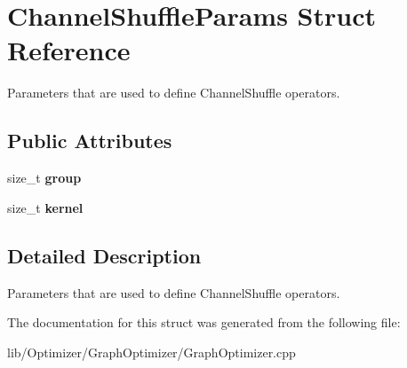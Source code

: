 \hypertarget{struct_channel_shuffle_params}{}\section{Channel\+Shuffle\+Params Struct Reference}
\label{struct_channel_shuffle_params}


Parameters that are used to define Channel\+Shuffle operators.  


\subsection*{Public Attributes}
\begin{DoxyCompactItemize}
\item 
\mbox{\label{struct_channel_shuffle_params_afd4c9ea7cb61d5cefaf8bf1bc5acb536}} 
size\+\_\+t {\bfseries group}
\item 
\mbox{\label{struct_channel_shuffle_params_a571560bc6c14ce29ff4e4d685b30e57e}} 
size\+\_\+t {\bfseries kernel}
\end{DoxyCompactItemize}


\subsection{Detailed Description}
Parameters that are used to define Channel\+Shuffle operators. 

The documentation for this struct was generated from the following file\+:\begin{DoxyCompactItemize}
\item 
lib/\+Optimizer/\+Graph\+Optimizer/Graph\+Optimizer.\+cpp\end{DoxyCompactItemize}
